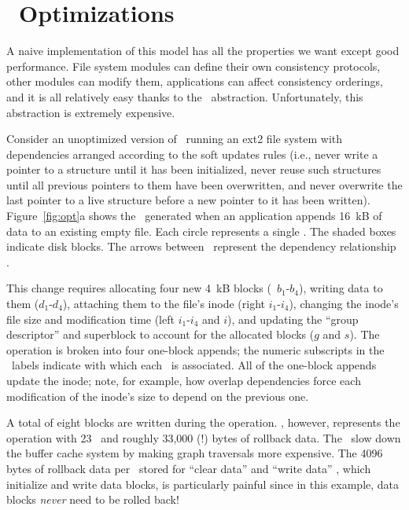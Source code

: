
\section{\Patch\ Optimizations}
\label{sec:patch:optimizations}

A naive implementation of this model has all the properties we want except
good performance.
%
File system modules can define their own consistency protocols, other
modules can modify them,
%
applications can affect consistency orderings, and it is all relatively
easy thanks to the \patch\ abstraction.
%
Unfortunately, this abstraction is extremely expensive.


Consider an unoptimized version of \Kudos\ running an ext2 file system with
dependencies arranged according to the soft updates rules (i.e., never write a
pointer to a structure until it has been initialized, never reuse such
structures until all previous pointers to them have been overwritten, and
never overwrite the last pointer to a live structure before a new pointer to
it has been written).
%
Figure~\ref{fig:opt}a shows the \patches\ generated when an application appends
16~kB of data to an existing empty file.
%
Each circle represents a single \patch. The shaded boxes indicate disk blocks.
%
The arrows between \patches\ represent the dependency relationship \PDDepend.

This change requires allocating four new 4~kB blocks (\patches\ $b_1$-$b_4$),
writing data to them ($d_1$-$d_4$), attaching them to the file's inode (right
$i_1$-$i_4$), changing the inode's file size and modification time (left
$i_1$-$i_4$ and $i$), and updating the ``group descriptor'' and superblock to
account for the allocated blocks ($g$ and $s$).
%
The operation is broken into four one-block appends; the numeric subscripts in
the \patch\ labels indicate with which each \patch\ is associated.
%
All of the one-block appends update the inode; note, for example, how overlap
dependencies force each modification of the inode's size to depend on the
previous one.

A total of eight blocks are written during the operation.
%
\Kudos, however, represents the operation with 23 \patches\ and roughly 33,000
(!) bytes of rollback data.
%
The \patches\ slow down the buffer cache system by making graph traversals
more expensive.
%
The 4096 bytes of rollback data per \patch\ stored for ``clear data'' and
``write data'' \patches, which initialize and write data blocks, is
particularly painful since in this example, data blocks \emph{never}
need to be rolled back!


